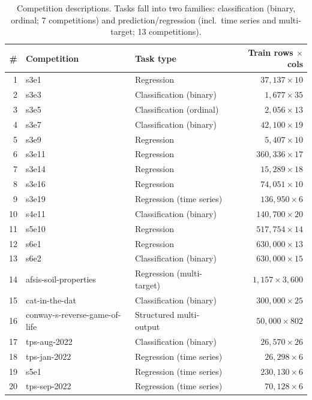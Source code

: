 \documentclass[11pt,a4paper]{article}
\begin{document}
\begin{table}[htbp]
\centering\small
\caption{Competition descriptions. Tasks fall into two families: classification (binary, ordinal; 7 competitions) and prediction/regression (incl.\ time series and multi-target; 13 competitions).}
\label{tab:comps}
\begin{tabular}{@{}rllr@{}}
\toprule
\# & \textbf{Competition} & \textbf{Task type} & \textbf{Train rows $\times$ cols} \\
\midrule
1 & s3e1 & Regression & $37{,}137 \times 10$ \\
2 & s3e3 & Classification (binary) & $1{,}677 \times 35$ \\
3 & s3e5 & Classification (ordinal) & $2{,}056 \times 13$ \\
4 & s3e7 & Classification (binary) & $42{,}100 \times 19$ \\
5 & s3e9 & Regression & $5{,}407 \times 10$ \\
6 & s3e11 & Regression & $360{,}336 \times 17$ \\
7 & s3e14 & Regression & $15{,}289 \times 18$ \\
8 & s3e16 & Regression & $74{,}051 \times 10$ \\
9 & s3e19 & Regression (time series) & $136{,}950 \times 6$ \\
10 & s4e11 & Classification (binary) & $140{,}700 \times 20$ \\
11 & s5e10 & Regression & $517{,}754 \times 14$ \\
12 & s6e1 & Regression & $630{,}000 \times 13$ \\
13 & s6e2 & Classification (binary) & $630{,}000 \times 15$ \\
14 & afsis-soil-properties & Regression (multi-target) & $1{,}157 \times 3{,}600$ \\
15 & cat-in-the-dat & Classification (binary) & $300{,}000 \times 25$ \\
16 & conway-s-reverse-game-of-life & Structured multi-output & $50{,}000 \times 802$ \\
17 & tps-aug-2022 & Classification (binary) & $26{,}570 \times 26$ \\
18 & tps-jan-2022 & Regression (time series) & $26{,}298 \times 6$ \\
19 & s5e1 & Regression (time series) & $230{,}130 \times 6$ \\
20 & tps-sep-2022 & Regression (time series) & $70{,}128 \times 6$ \\
\bottomrule
\end{tabular}
\end{table}
\end{document}
